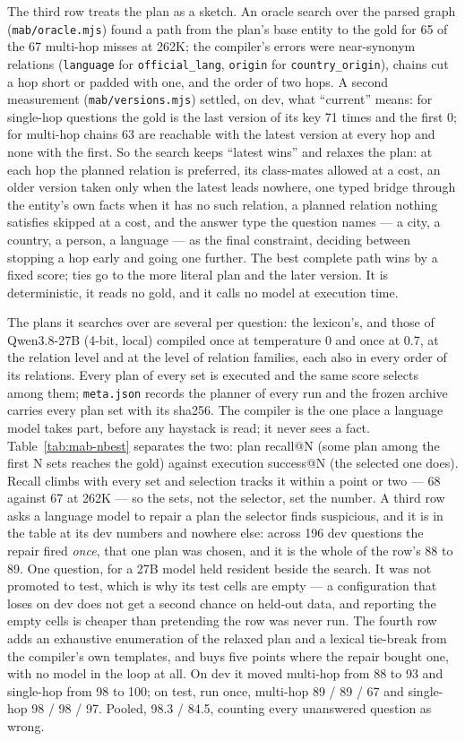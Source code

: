 \documentclass[11pt]{article}
\begin{document}
The third row treats the plan as a sketch. An oracle search over the
parsed graph (\texttt{mab/oracle.mjs}) found a path from the plan's base
entity to the gold for 65 of the 67 multi-hop misses at 262K; the compiler's
errors were near-synonym relations (\texttt{language} for
\texttt{official\_lang}, \texttt{origin} for \texttt{country\_origin}),
chains cut a hop short or padded with one, and the order of two hops. A
second measurement (\texttt{mab/versions.mjs}) settled, on dev, what
``current'' means: for single-hop questions the gold is the last version of
its key 71 times and the first 0; for multi-hop chains 63 are reachable with
the latest version at every hop and none with the first. So the search keeps
``latest wins'' and relaxes the plan: at each hop the planned relation is
preferred, its class-mates allowed at a cost, an older version taken only
when the latest leads nowhere, one typed bridge through the entity's own
facts when it has no such relation, a planned relation nothing satisfies
skipped at a cost, and the answer type the question names --- a city, a
country, a person, a language --- as the final constraint, deciding between
stopping a hop early and going one further. The best complete path wins by a
fixed score; ties go to the more literal plan and the later version. It is
deterministic, it reads no gold, and it calls no model at execution time.

The plans it searches over are several per question: the lexicon's, and
those of Qwen3.8-27B (4-bit, local) compiled once at temperature 0 and once
at 0.7, at the relation level and at the level of relation families, each
also in every order of its relations. Every plan of every set is executed
and the same score selects among them; \texttt{meta.json} records the
planner of every run and the frozen archive carries every plan set with its
sha256. The compiler is the one place a language model takes part, before any
haystack is read; it never sees a fact. Table~\ref{tab:mab-nbest} separates
the two: plan recall@N (some plan among the first N sets reaches the gold)
against execution success@N (the selected one does). Recall climbs with
every set and selection tracks it within a point or two --- 68 against 67
at 262K --- so the sets, not the selector, set the number. A third row asks a language model to repair a
plan the selector finds suspicious, and it is in the table at its dev numbers
and nowhere else: across 196 dev questions the repair fired \emph{once}, that
one plan was chosen, and it is the whole of the row's 88 to 89. One question,
for a 27B model held resident beside the search. It was not promoted to test,
which is why its test cells are empty --- a configuration that loses on dev does
not get a second chance on held-out data, and reporting the empty cells is
cheaper than pretending the row was never run. The fourth row
adds an exhaustive enumeration of the relaxed plan and a lexical tie-break
from the compiler's own templates, and buys five points where the repair bought
one, with no model in the loop at all. On dev it moved multi-hop from 88 to 93
and single-hop from 98 to 100; on test, run once, multi-hop 89 / 89 / 67 and
single-hop 98 / 98 / 97. Pooled, 98.3 / 84.5, counting every unanswered
question as wrong.
\end{document}
